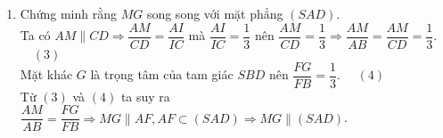 \begin{bt}
{\begin{enumerate}
{}  		
 		\item Chứng minh rằng $MG$ song song với mặt phẳng $\left(SAD\right)$.\\
 		Ta có $AM\parallel CD\Rightarrow \dfrac{AM}{CD}=\dfrac{AI}{IC}$ mà $\dfrac{AI}{IC}=\dfrac{1}{3}$ nên $\dfrac{AM}{CD}=\dfrac{1}{3}\Rightarrow \dfrac{AM}{AB}=\dfrac{AM}{CD}=\dfrac{1}{3}$. $ \quad (3) $\\ 
 		Mặt khác $G$ là trọng tâm của tam giác $SBD$ nên $\dfrac{FG}{FB}=\dfrac{1}{3}$. $ \quad (4) $\\ 
 		Từ $(3)$ và $(4)$ ta suy ra $\dfrac{AM}{AB}=\dfrac{FG}{FB}\Rightarrow MG\parallel AF, AF\subset \left( SAD \right) \Rightarrow MG\parallel \left( SAD \right)$.
 		\end{enumerate}}
\end{bt}


